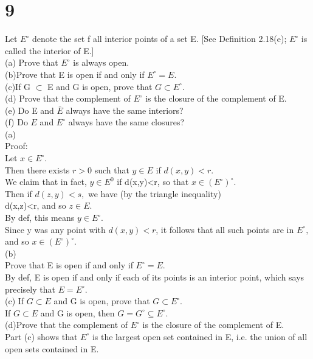 \section*{9}
Let $E^\circ$ denote the set f all interior points of a set E. [See Definition 2.18(e); $E^ \circ$ is called the interior of E.]\\ 
(a) Prove that $E^ \circ$ is always open. \\ 
(b)Prove that E is open if and only if $E^\circ =E.$ \\ 
(c)If G $\subset$ E and G is open, prove that $G \subset E^\circ.$ \\ 
(d) Prove that the complement of $E^\circ$ is the closure of the complement of E. \\ 
(e) Do E and $\bar{E}$ always have the same interiors? \\ 
(f) Do $E$ and $E^\circ$ always have the same closures? \\ 
(a) \\ 
Proof: \\ 
Let $x \in E^{\circ}.$ \\ 
Then there exists $r>0$ such that $y \in E$ if $d(x,y)<r.$ \\ 
We claim that in fact, $y \in E^0$ if d(x,y)<r, so that $x \in (E^ {\circ})^{\circ}.$ \\ 
Then if $d(z,y)<s,$ we have (by the triangle inequality) \\ d(x,z)<r, and so $z \in E.$ \\ 
By def, this means $y \in E^{\circ}.$\\ 
Since y was any point with $d(x,y)<r$, it follows that all such points are in $E^{\circ},$ and so $x \in (E^{\circ})^{\circ}.$ \\ 
(b) \\ 
Prove that E is open if and only if $E^{\circ}=E.$ \\ 
By def, E is open if and only if each of its points is an interior point, which says precisely that $E = E^{\circ}.$ \\ 
(c) If $G \subset E$ and G is open, prove that $G \subset E^{\circ}.$ \\ 
If $G \subset E$ and G is open, then $G=G^{\circ} \subseteq E^{\circ}.$ \\ 
(d)Prove that the complement of $E^{\circ}$ is the closure of the complement of E. \\ 
Part (c) shows that $E^{\circ}$ is the largest open set contained in E, i.e. the union of all open sets contained in E. \\ 
